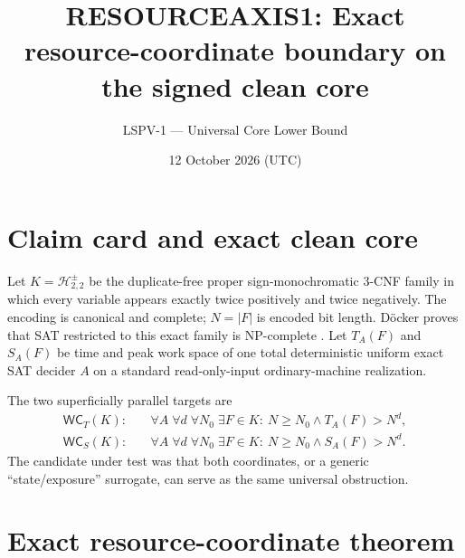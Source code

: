\documentclass[11pt]{article}
\title{RESOURCEAXIS1: Exact resource-coordinate boundary on the signed clean core}
\author{LSPV-1 --- Universal Core Lower Bound}
\date{12 October 2026 (UTC)}
\newcommand{\Hsigned}{\mathcal H^{\pm}_{2,2}}
\begin{document}
\maketitle

\begin{center}
\end{center}

\section{Claim card and exact clean core}

Let $K=\Hsigned$ be the duplicate-free proper sign-monochromatic 3-CNF
family in which every variable appears exactly twice positively and twice
negatively.  The encoding is canonical and complete; $N=|F|$ is encoded bit
length.  D\"ocker proves that SAT restricted to this exact family is
NP-complete \cite{Docker19}.  Let $T_A(F)$ and $S_A(F)$ be time and peak work
space of one total deterministic uniform exact SAT decider $A$ on a standard
read-only-input ordinary-machine realization.

The two superficially parallel targets are
\begin{align}
 \mathsf{WC}_T(K):\quad&
 \forall A\;\forall d\;\forall N_0\;\exists F\in K:\
 N\ge N_0\land T_A(F)>N^d,                                  \tag{1}\\
 \mathsf{WC}_S(K):\quad&
 \forall A\;\forall d\;\forall N_0\;\exists F\in K:\
 N\ge N_0\land S_A(F)>N^d.                                  \tag{2}
\end{align}
The candidate under test was that both coordinates, or a generic
``state/exposure'' surrogate, can serve as the same universal obstruction.

\section{Exact resource-coordinate theorem}
\end{document}
